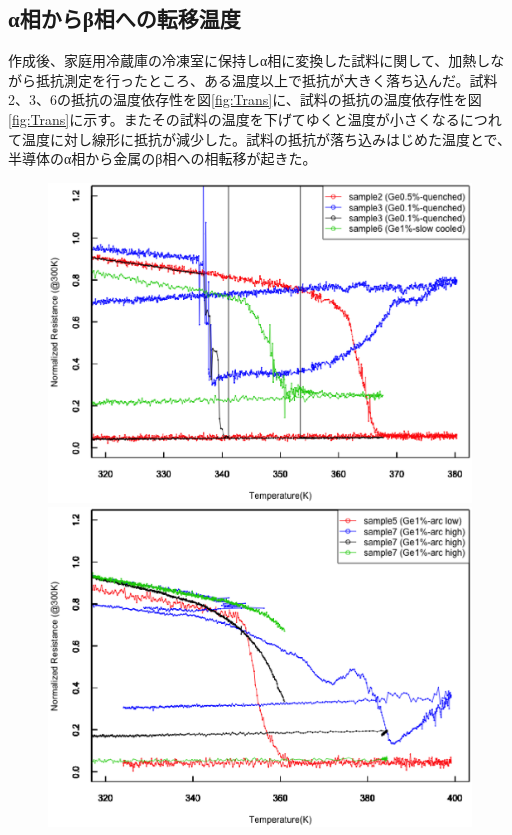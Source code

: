 \subsection{α相からβ相への転移温度}
作成後、家庭用冷蔵庫の冷凍室に保持しα相に変換した試料に関して、加熱しながら抵抗測定を行ったところ、ある温度以上で抵抗が大きく落ち込んだ。試料2、3、6の抵抗の温度依存性を図\ref{fig:Trans}に、試料の抵抗の温度依存性を図\ref{fig:Trans}に示す。またその試料の温度を下げてゆくと温度が小さくなるにつれて温度に対し線形に抵抗が減少した。試料の抵抗が落ち込みはじめた温度とで、半導体のα相から金属のβ相への相転移が起きた。
\begin{figure}[!h]
 \begin{minipage}{\hsize}
    \begin{center}
   \includegraphics[width=0.9\hsize]{results_discussions/Trans.eps}
  \end{center}
  \caption{}
  \label{fig:Trans}
 \end{minipage}
 \begin{minipage}{\hsize}
     \begin{center}
   \includegraphics[width=0.9\hsize]{results_discussions/Trans2.eps}
  \end{center}
  \caption{}
  \label{fig:Trans2}
   \end{minipage}
\end{figure}

